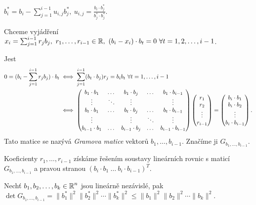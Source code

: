 \begin{notation}
$b_i^*=b_i-\sum_{j=1}^{i-1} u_{i,j}b_j^*,\ u_{i,j}=\frac{b_i\cdot b_j^*}{b_j^*\cdot b_j^*}$.

Chceme vyjádření $x_i=\sum_{j=1}^{i-1} r_jb_j,\ r_1,\ldots,r_{i-1}\in \operatorname{\mathbb{R}},\ (b_i-x_i)\cdot b_t=0\ \forall t=1,2,\ldots,i-1$.

Jest 
\begin{align*}
    0=(b_i-\sum_{j=1}^{i-1}r_j b_j)\cdot b_t & \iff  \sum_{j=1}^{i-1}(b_t\cdot b_j)r_j=b_i b_t \ \forall t=1,\ldots,i-1\\
    & \iff \begin{pmatrix}
b_1 \cdot b_1 & \dots & b_1 \cdot b_j & \dots & b_1 \cdot b_{i-1}\\
\vdots & \ddots & \vdots & & \vdots\\
b_t \cdot b_1 & \dots & b_t\cdot b_j & \dots & b_t \cdot b_{i-1}\\
\vdots & & \vdots & \ddots & \vdots\\
b_{i-1} \cdot b_1 & \dots & b_{i-1}\cdot b_j & \dots & b_{i-1} \cdot b_{i-1}\\
\end{pmatrix} \begin{pmatrix} r_1 \\ r_2 \\ \vdots \\ r_{i-1} \end{pmatrix}=\begin{pmatrix} b_i\cdot b_1 \\ b_i\cdot b_2 \\ \vdots \\ b_i\cdot b_{i-1} \end{pmatrix}.
\end{align*}
Tato matice se nazývá \emph{Gramova matice} vektorů $b_1,\ldots,b_{i-1}$. Značíme ji
$G_{b_1,\ldots,b_{i-1}}$.

Koeficienty $r_1,\ldots,r_{i-1}$ získáme řešením soustavy lineárních rovnic s maticí $G_{b_1,\ldots,b_{i-1}}$ a pravou stranou $(b_i \cdot b_1 \ \ldots \ b_i \cdot b_{i-1})^T$.
\end{notation}

\begin{claim}
Nechť $b_1,b_2,\ldots,b_k\in\operatorname{\mathbb{R}}^n$ jsou lineárně nezávislé, pak $\det G_{b_1,\ldots,b_{i-1}}=\|b_1^*\|^2\|b_2^*\|^2\cdots\|b_k^*\|^2\leq\|b_1\|^2\|b_2\|^2\cdots\|b_k\|^2$.
\end{claim}

